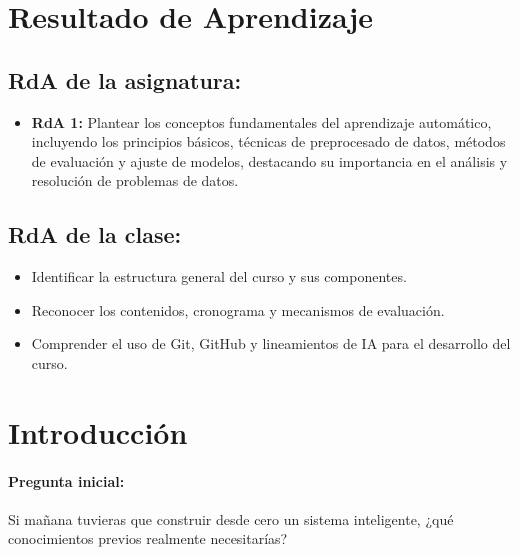 \documentclass[a4,11pt]{aleph-notas}
\begin{document}
\encabezado

\section*{Resultado de Aprendizaje}

\subsection*{RdA de la asignatura:}
\begin{itemize}[leftmargin=*]
    \item \textbf{RdA 1:} Plantear los conceptos fundamentales del aprendizaje automático, incluyendo los principios básicos, técnicas de preprocesado de datos, métodos de evaluación y ajuste de modelos, destacando su importancia en el análisis y resolución de problemas de datos.
\end{itemize}

\subsection*{RdA de la clase:}
\begin{itemize}[leftmargin=*]
    \item Identificar la estructura general del curso y sus componentes.
    \item Reconocer los contenidos, cronograma y mecanismos de evaluación.
    \item Comprender el uso de Git, GitHub y lineamientos de IA para el desarrollo del curso.
\end{itemize}

\section*{Introducción}

\paragraph{Pregunta inicial:}
Si mañana tuvieras que construir desde cero un sistema inteligente, ¿qué conocimientos previos realmente necesitarías?
\end{document}
